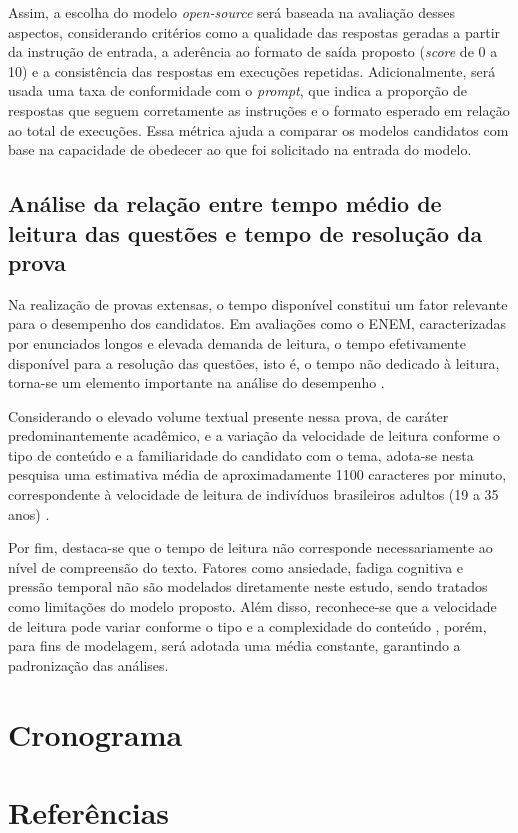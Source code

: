 \documentclass[a4paper,10pt, twocolumn]{article}
\begin{document}
Assim, a escolha do modelo \textit{open-source} será baseada na avaliação desses aspectos, considerando critérios como a qualidade das respostas geradas a partir da instrução de entrada, a aderência ao formato de saída proposto (\textit{score} de 0 a 10) e a consistência das respostas em execuções repetidas. Adicionalmente, será usada uma taxa de conformidade com o \textit{prompt}, que indica a proporção de respostas que seguem corretamente as instruções e o formato esperado em relação ao total de execuções. Essa métrica ajuda a comparar os modelos candidatos com base na capacidade de obedecer ao que foi solicitado na entrada do modelo.

\subsection{Análise da relação entre tempo médio de leitura das questões e tempo de resolução da prova}

Na realização de provas extensas, o tempo disponível constitui um fator relevante para o desempenho dos candidatos. Em avaliações como o ENEM, caracterizadas por enunciados longos e elevada demanda de leitura, o tempo efetivamente disponível para a resolução das questões, isto é, o tempo não dedicado à leitura, torna-se um elemento importante na análise do desempenho \textcite{cratilo2021leitura}.

Considerando o elevado volume textual presente nessa prova, de caráter predominantemente acadêmico, e a variação da velocidade de leitura conforme o tipo de conteúdo e a familiaridade do candidato com o tema, adota-se nesta pesquisa uma estimativa média de aproximadamente 1100 caracteres por minuto, correspondente à velocidade de leitura de indivíduos brasileiros adultos (19 a 35 anos) \cite{Messias2008}.

Por fim, destaca-se que o tempo de leitura não corresponde necessariamente ao nível de compreensão do texto. Fatores como ansiedade, fadiga cognitiva e pressão temporal não são modelados diretamente neste estudo, sendo tratados como limitações do modelo proposto. Além disso, reconhece-se que a velocidade de leitura pode variar conforme o tipo e a complexidade do conteúdo \cite{Wallot2014}, porém, para fins de modelagem, será adotada uma média constante, garantindo a padronização das análises.

\section{Cronograma}
\section{Referências}
\printbibliography[heading=none]
\end{document}
